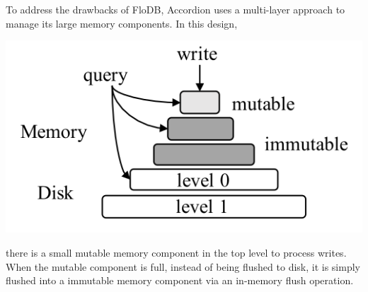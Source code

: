 \documentclass[11pt]{article}
\begin{document}
To address the drawbacks of FloDB, Accordion uses a multi-layer approach to manage its large memory
components. In this design,
\begin{center}
\includegraphics[width=.8\textwidth]{../../images/db/11.png}
\end{center}
there is a small mutable memory component in the top level to process writes. When the mutable
component is full, instead of being flushed to disk, it is simply flushed into a immutable memory
component via an in-memory flush operation.
\end{document}
